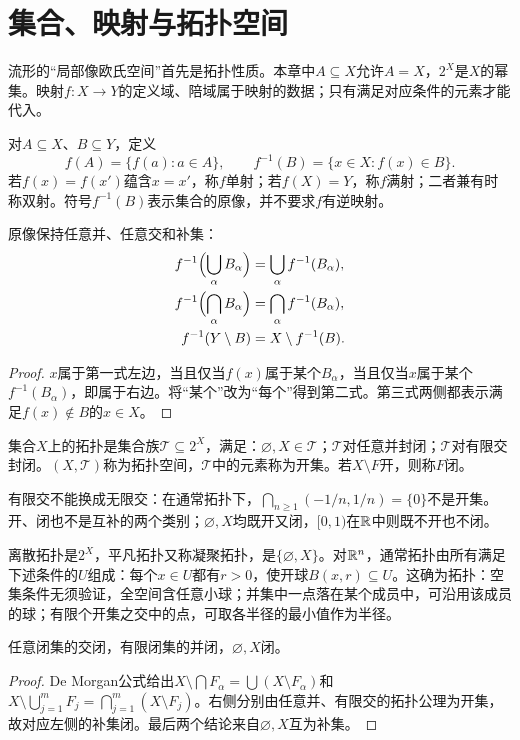 \section{集合、映射与拓扑空间}
流形的“局部像欧氏空间”首先是拓扑性质。本章中$A\subseteq X$允许$A=X$，$2^X$是$X$的幂集。映射$f:X\to Y$的定义域、陪域属于映射的数据；只有满足对应条件的元素才能代入。
\begin{definition}[像、原像与双射]
对$A\subseteq X$、$B\subseteq Y$，定义
\[
f(A)=\{f(a):a\in A\},\qquad f^{-1}(B)=\{x\in X:f(x)\in B\}.
\]
若$f(x)=f(x')$蕴含$x=x'$，称$f$单射；若$f(X)=Y$，称$f$满射；二者兼有时称双射。符号$f^{-1}(B)$表示集合的原像，并不要求$f$有逆映射。
\end{definition}
\begin{theorem}[原像的集合运算]
原像保持任意并、任意交和补集：
\begin{align*}
f^{-1}\Bigl(\bigcup_\alpha B_\alpha\Bigr)&=\bigcup_\alpha f^{-1}(B_\alpha),\\
f^{-1}\Bigl(\bigcap_\alpha B_\alpha\Bigr)&=\bigcap_\alpha f^{-1}(B_\alpha),\\
f^{-1}(Y\setminus B)&=X\setminus f^{-1}(B).
\end{align*}
\end{theorem}
\begin{proof}
$x$属于第一式左边，当且仅当$f(x)$属于某个$B_\alpha$，当且仅当$x$属于某个$f^{-1}(B_\alpha)$，即属于右边。将“某个”改为“每个”得到第二式。第三式两侧都表示满足$f(x)\notin B$的$x\in X$。
\end{proof}
\begin{definition}[拓扑空间]
集合$X$上的拓扑是集合族$\mathcal T\subseteq2^X$，满足：$\varnothing,X\in\mathcal T$；$\mathcal T$对任意并封闭；$\mathcal T$对有限交封闭。$(X,\mathcal T)$称为拓扑空间，$\mathcal T$中的元素称为开集。若$X\setminus F$开，则称$F$闭。
\end{definition}
有限交不能换成无限交：在通常拓扑下，$\bigcap_{n\geq1}(-1/n,1/n)=\{0\}$不是开集。开、闭也不是互补的两个类别；$\varnothing,X$均既开又闭，$[0,1)$在$\mathbb{R}$中则既不开也不闭。
\begin{example}[三种基本拓扑]
离散拓扑是$2^X$，平凡拓扑又称凝聚拓扑，是$\{\varnothing,X\}$。对$\mathbb{R}^n$，通常拓扑由所有满足下述条件的$U$组成：每个$x\in U$都有$r>0$，使开球$B(x,r)\subseteq U$。这确为拓扑：空集条件无须验证，全空间含任意小球；并集中一点落在某个成员中，可沿用该成员的球；有限个开集之交中的点，可取各半径的最小值作为半径。
\end{example}
\begin{theorem}[闭集运算]
任意闭集的交闭，有限闭集的并闭，$\varnothing,X$闭。
\end{theorem}
\begin{proof}
De Morgan公式给出$X\setminus\bigcap F_\alpha=\bigcup(X\setminus F_\alpha)$和$X\setminus\bigcup_{j=1}^mF_j=\bigcap_{j=1}^m(X\setminus F_j)$。右侧分别由任意并、有限交的拓扑公理为开集，故对应左侧的补集闭。最后两个结论来自$\varnothing,X$互为补集。
\end{proof}

